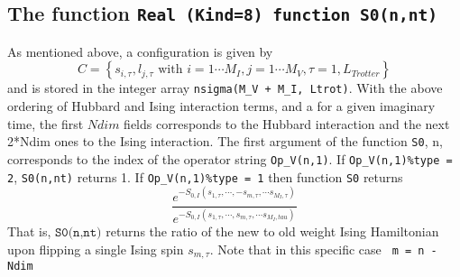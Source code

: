 \subsection{The function \texttt{Real (Kind=8) function S0(n,nt)} }
As mentioned above,  a configuration is given by
\begin{equation}
	C = \left\{   s_{i,\tau} ,  l_{j,\tau}  \text{ with }  i=1\cdots M_I,  j = 1\cdots M_V,  \tau=1,L_{Trotter}  \right\}
\end{equation}
and is stored in the  integer array \texttt{nsigma(M\_V + M\_I, Ltrot)}.  With the above ordering of Hubbard and Ising interaction terms,  and a for a given  imaginary time, the first $Ndim$ 
fields corresponds to the Hubbard  interaction and the next 2*Ndim ones to the Ising interaction.    The first   argument of the function \texttt{S0}, n,  corresponds to the index of the operator  string 
\texttt{Op\_V(n,1)}. If \texttt{Op\_V(n,1)\%type = 2},    \texttt{S0(n,nt)}  returns 1.  If   \texttt{Op\_V(n,1)\%type = 1}  then function \texttt{S0}  returns
\begin{equation}
\frac{e^{-S_{0,I} \left(  s_{1,\tau},  \cdots,  - s_{m,\tau},  \cdots s_{M_I,\tau}   \right) } }{e^{-S_{0,I}  \left(  s_{1,\tau},  \cdots,   s_{m,\tau},  \cdots s_{M_I,tau}   \right)   } }	
\end{equation}
That is,  $ \texttt{S0(n,nt)} $  returns the ratio of the new to old weight  Ising Hamiltonian upon flipping a single Ising spin $ s_{m,\tau} $. Note that in  this specific case  \texttt{ m = n -  Ndim } 
 

